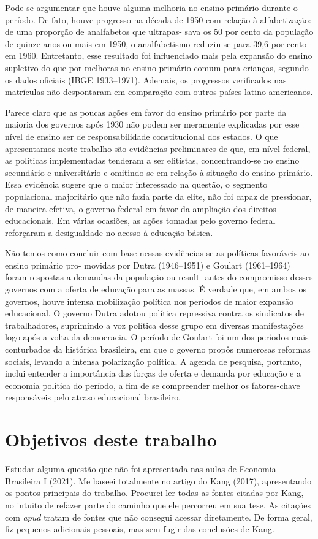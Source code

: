 \documentclass[a4paper,12pt]{article}
\begin{document}
Pode-se argumentar que houve alguma melhoria no ensino primário durante o período. De fato, houve progresso na década de 1950 com relação à alfabetização: de uma proporção de analfabetos que ultrapas- sava os 50 por cento da população de quinze anos ou mais em 1950, o analfabetismo reduziu-se para 39,6 por cento em 1960. Entretanto, esse resultado foi influenciado mais pela expansão do ensino supletivo do que por melhoras no ensino primário comum para crianças, segundo os dados oficiais (IBGE 1933–1971). Ademais, os progressos verificados nas matrículas não despontaram em comparação com outros países latino-americanos.

Parece claro que as poucas ações em favor do ensino primário por parte da maioria dos governos após 1930 não podem ser meramente explicadas por esse nível de ensino ser de responsabilidade constitucional dos estados. O que apresentamos neste trabalho são evidências preliminares de que, em nível federal, as políticas implementadas tenderam a ser elitistas, concentrando-se no ensino secundário e universitário e omitindo-se em relação à situação do ensino primário. Essa evidência sugere que o maior interessado na questão, o segmento populacional majoritário que não fazia parte da elite, não foi capaz de pressionar, de maneira efetiva, o governo federal em favor da ampliação dos direitos educacionais. Em várias ocasiões, as ações tomadas pelo governo federal reforçaram a desigualdade no acesso à educação básica.

Não temos como concluir com base nessas evidências se as políticas favoráveis ao ensino primário pro- movidas por Dutra (1946–1951) e Goulart (1961–1964) foram respostas a demandas da população ou result- antes do compromisso desses governos com a oferta de educação para as massas. É verdade que, em ambos os governos, houve intensa mobilização política nos períodos de maior expansão educacional. O governo Dutra adotou política repressiva contra os sindicatos de trabalhadores, suprimindo a voz política desse grupo em diversas manifestações logo após a volta da democracia. O período de Goulart foi um dos períodos mais conturbados da histórica brasileira, em que o governo propôs numerosas reformas sociais, levando a intensa polarização política. A agenda de pesquisa, portanto, inclui entender a importância das forças de oferta e demanda por educação e a economia política do período, a fim de se compreender melhor os fatores-chave responsáveis pelo atraso educacional brasileiro.

\section*{Objetivos deste trabalho}
Estudar alguma questão que não foi apresentada nas aulas de Economia Brasileira I (2021). Me baseei totalmente no artigo do Kang (2017), apresentando os pontos principais do trabalho. Procurei ler todas as fontes citadas por Kang, no intuito de refazer parte do caminho que ele percorreu em sua tese. As citações com \textit{apud} tratam de fontes que não consegui acessar diretamente.
De forma geral, fiz pequenos adicionais pessoais, mas sem fugir das conclusões de Kang.

\newpage

\printbibliography
{}
\end{document}
